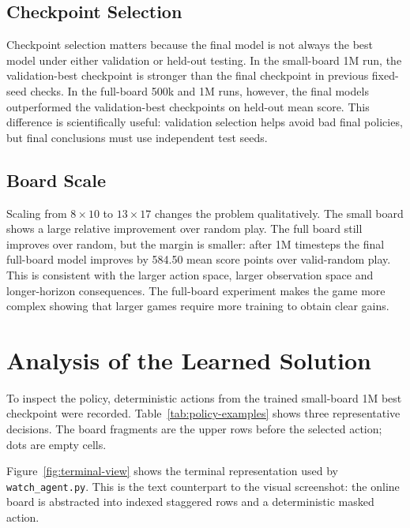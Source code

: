 \documentclass[10pt,a4paper]{article}
\begin{document}
\subsection{Checkpoint Selection}

Checkpoint selection matters because the final model is not always the best model under either validation or held-out testing. In the small-board 1M run, the validation-best checkpoint is stronger than the final checkpoint in previous fixed-seed checks. In the full-board 500k and 1M runs, however, the final models outperformed the validation-best checkpoints on held-out mean score. This difference is scientifically useful: validation selection helps avoid bad final policies, but final conclusions must use independent test seeds.

\subsection{Board Scale}

Scaling from \(8\times10\) to \(13\times17\) changes the problem qualitatively. The small board shows a large relative improvement over random play. The full board still improves over random, but the margin is smaller: after 1M timesteps the final full-board model improves by 584.50 mean score points over valid-random play. This is consistent with the larger action space, larger observation space and longer-horizon consequences. The full-board experiment makes the game more complex showing that larger games require more training to obtain clear gains.

\section{Analysis of the Learned Solution}

To inspect the policy, deterministic actions from the trained small-board 1M best checkpoint were recorded. Table~\ref{tab:policy-examples} shows three representative decisions. The board fragments are the upper rows before the selected action; dots are empty cells.

Figure~\ref{fig:terminal-view} shows the terminal representation used by \texttt{watch\_agent.py}. This is the text counterpart to the visual screenshot: the online board is abstracted into indexed staggered rows and a deterministic masked action.
\end{document}
